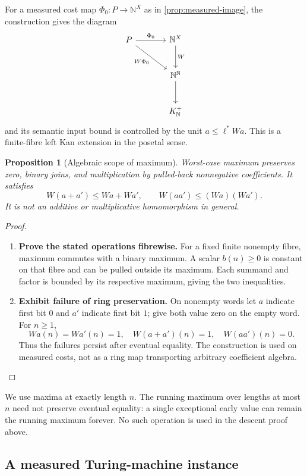 \documentclass[11pt,a4paper]{article}
\numberwithin{algorithm}{section}
\numberwithin{equation}{section}
\newtheorem{proposition}[proposition]{Proposition}
\theoremstyle{definition}
\theoremstyle{remark}
\theoremstyle{plain}
\newcommand{\N}{\mathbb N}
\theoremstyle{definition}
\theoremstyle{plain}
\begin{document}
For a measured cost map $\Phi_0:P\to\N^X$ as in
\cref{prop:measured-image}, the construction gives the diagram
\[
\begin{tikzcd}[column sep=large,row sep=large]
P \arrow[r,"\Phi_0"] \arrow[dr,"W\Phi_0"'] &
 \N^X \arrow[d,"W"]\\
&\N^\N \arrow[d]\\
&K_\N^+
\end{tikzcd}
\]
and its semantic input bound is controlled by the unit
$a\le\ell^*Wa$. This is a finite-fibre left Kan extension in the
posetal sense.

\begin{proposition}[Algebraic scope of maximum]
\label{prop:wc-nonlinear}
Worst-case maximum preserves zero, binary joins, and multiplication by
pulled-back nonnegative coefficients. It satisfies
\[
 W(a+a')\le Wa+Wa',\qquad W(aa')\le(Wa)(Wa').
\]
It is not an additive or multiplicative homomorphism in general.
\end{proposition}
\begin{proof}\leavevmode
\begin{enumerate}[leftmargin=*,align=left]
\item \textbf{Prove the stated operations fibrewise.}
For a fixed finite nonempty fibre, maximum commutes with a binary
maximum. A scalar $b(n)\ge0$ is constant on that fibre and can be
pulled outside its maximum. Each summand and factor is bounded by
its respective maximum, giving the two inequalities.
\item \textbf{Exhibit failure of ring preservation.}
On nonempty words let $a$ indicate first bit $0$ and $a'$ indicate
first bit $1$; give both value zero on the empty word. For $n\ge1$,
\[
 Wa(n)=Wa'(n)=1,\quad W(a+a')(n)=1,\quad W(aa')(n)=0.
\]
Thus the failures persist after eventual equality. The construction
is used on measured costs, not as a ring map transporting arbitrary
coefficient algebra.
\end{enumerate}
\end{proof}

We use maxima at exactly length $n$. The running maximum over lengths
at most $n$ need not preserve eventual equality: a single exceptional
early value can remain the running maximum forever. No such operation
is used in the descent proof above.


\subsection{A measured Turing-machine instance}
\end{document}
